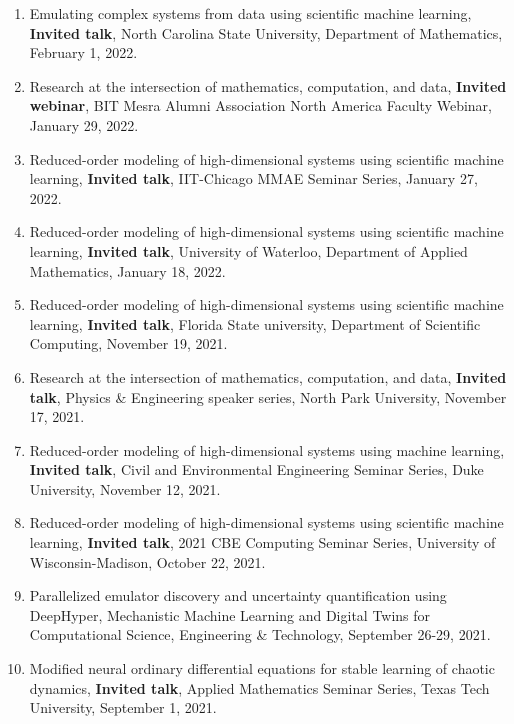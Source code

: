 \documentclass[letterpaper]{article}
\begin{document}
\begin{enumerate}
\item Emulating complex systems from data using scientific machine learning, \textbf{Invited talk}, North Carolina State University, Department of Mathematics, February 1, 2022.

\item Research at the intersection of mathematics, computation, and data, \textbf{Invited webinar}, BIT Mesra Alumni Association North America Faculty Webinar, January 29, 2022.

\item Reduced-order modeling of high-dimensional systems using scientific machine learning, \textbf{Invited talk}, IIT-Chicago MMAE Seminar Series, January 27, 2022.

\item Reduced-order modeling of high-dimensional systems using scientific machine learning, \textbf{Invited talk}, University of Waterloo, Department of Applied Mathematics, January 18, 2022.

\item Reduced-order modeling of high-dimensional systems using scientific machine learning, \textbf{Invited talk}, Florida State university, Department of Scientific Computing, November 19, 2021.

\item Research at the intersection of mathematics, computation, and data, \textbf{Invited talk}, Physics \& Engineering speaker series, North Park University, November 17, 2021.

\item Reduced-order modeling of high-dimensional systems using machine learning, \textbf{Invited talk}, Civil and Environmental Engineering Seminar Series, Duke University, November 12, 2021.

\item Reduced-order modeling of high-dimensional systems using scientific machine learning, \textbf{Invited talk}, 2021 CBE Computing Seminar Series, University of Wisconsin-Madison, October 22, 2021.

\item Parallelized emulator discovery and uncertainty quantification using DeepHyper, Mechanistic Machine Learning and Digital Twins for Computational Science, Engineering \& Technology, September 26-29, 2021.

\item Modified neural ordinary differential equations for stable learning of chaotic dynamics, \textbf{Invited talk}, Applied Mathematics Seminar Series, Texas Tech University, September 1, 2021.


\end{enumerate}
\end{document}
